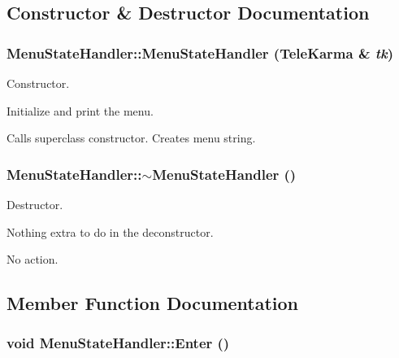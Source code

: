 \subsection{Constructor \& Destructor Documentation}
\hypertarget{classMenuStateHandler_432b787055df296308029da13cbf48e6}{
\subsubsection[{MenuStateHandler}]{\setlength{\rightskip}{0pt plus 5cm}MenuStateHandler::MenuStateHandler ({\bf TeleKarma} \& {\em tk})}}
\label{classMenuStateHandler_432b787055df296308029da13cbf48e6}


Constructor. 

Initialize and print the menu.

Calls superclass constructor. Creates menu string.\hypertarget{classMenuStateHandler_e9c7e8689f7264102a347e4c482927b2}{
\subsubsection[{$\sim$MenuStateHandler}]{\setlength{\rightskip}{0pt plus 5cm}MenuStateHandler::$\sim$MenuStateHandler ()}}
\label{classMenuStateHandler_e9c7e8689f7264102a347e4c482927b2}


Destructor. 

Nothing extra to do in the deconstructor.

No action. 

\subsection{Member Function Documentation}
\hypertarget{classMenuStateHandler_b38fbf0fdf66be47ebb7e200a66925ba}{
\subsubsection[{Enter}]{\setlength{\rightskip}{0pt plus 5cm}void MenuStateHandler::Enter ()}}
\label{classMenuStateHandler_b38fbf0fdf66be47ebb7e200a66925ba}


